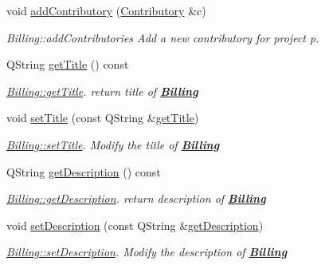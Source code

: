 \begin{DoxyCompactItemize}
void \hyperlink{classModels_1_1Billing_a3636d785d2cb77d83d21a795e1f91a60}{add\-Contributory} (\hyperlink{classModels_1_1Contributory}{Contributory} \&c)
\begin{DoxyCompactList}\small\item\em Billing\-::add\-Contributories Add a new contributory for project p. \end{DoxyCompactList}\item 
Q\-String \hyperlink{classModels_1_1Billing_a15cd358ce3cab05668c62c0771afdb85}{get\-Title} () const 
\begin{DoxyCompactList}\small\item\em \hyperlink{classModels_1_1Billing_a15cd358ce3cab05668c62c0771afdb85}{Billing\-::get\-Title}. return title of {\bfseries \hyperlink{classModels_1_1Billing}{Billing}} \end{DoxyCompactList}\item 
void \hyperlink{classModels_1_1Billing_ae20cea169abdffa5daaa368547425928}{set\-Title} (const Q\-String \&\hyperlink{classModels_1_1Billing_a15cd358ce3cab05668c62c0771afdb85}{get\-Title})
\begin{DoxyCompactList}\small\item\em \hyperlink{classModels_1_1Billing_ae20cea169abdffa5daaa368547425928}{Billing\-::set\-Title}. Modify the title of {\bfseries \hyperlink{classModels_1_1Billing}{Billing}} \end{DoxyCompactList}\item 
Q\-String \hyperlink{classModels_1_1Billing_a5802215da8f4407457b8aeb7be525c65}{get\-Description} () const 
\begin{DoxyCompactList}\small\item\em \hyperlink{classModels_1_1Billing_a5802215da8f4407457b8aeb7be525c65}{Billing\-::get\-Description}. return description of {\bfseries \hyperlink{classModels_1_1Billing}{Billing}} \end{DoxyCompactList}\item 
void \hyperlink{classModels_1_1Billing_adb5cf4382150387f10bb6b774ace6bc8}{set\-Description} (const Q\-String \&\hyperlink{classModels_1_1Billing_a5802215da8f4407457b8aeb7be525c65}{get\-Description})
\begin{DoxyCompactList}\small\item\em \hyperlink{classModels_1_1Billing_adb5cf4382150387f10bb6b774ace6bc8}{Billing\-::set\-Description}. Modify the description of {\bfseries \hyperlink{classModels_1_1Billing}{Billing}} \end{DoxyCompactList}\item 

\end{DoxyCompactItemize}
